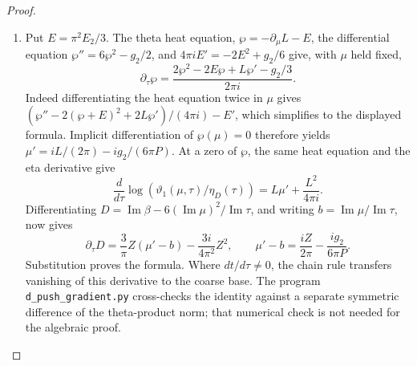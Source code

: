 \begin{proof}
\begin{enumerate}[label=\arabic*.,leftmargin=*]
\item Put \(E=\pi^2E_2/3\). The theta heat equation,
\(\wp=-\partial_\mu L-E\), the differential equation
\(\wp''=6\wp^2-g_2/2\), and
\(4\pi i E'=-2E^2+g_2/6\) give, with \(\mu\) held fixed,
\[
 \partial_\tau\wp=
 \frac{2\wp^2-2E\wp+L\wp'-g_2/3}{2\pi i}.
\]
Indeed differentiating the heat equation twice in \(\mu\) gives
\((\wp''-2(\wp+E)^2+2L\wp')/(4\pi i)-E'\), which simplifies to
the displayed formula. Implicit differentiation of \(\wp(\mu)=0\)
therefore yields
\(\mu'=iL/(2\pi)-ig_2/(6\pi P)\).
At a zero of \(\wp\), the same heat equation and the eta derivative
give
\[
 \frac{d}{d\tau}\log(\vartheta_1(\mu,\tau)/\eta_D(\tau))
       =L\mu'+\frac{L^2}{4\pi i}.
\]
Differentiating \(D=\operatorname{Im}\beta-
6(\operatorname{Im}\mu)^2/\operatorname{Im}\tau\), and writing
\(b=\operatorname{Im}\mu/\operatorname{Im}\tau\), now gives
\[
 \partial_\tau D=\frac3\pi Z(\mu'-b)
                         -\frac{3i}{4\pi^2}Z^2,
 \qquad \mu'-b=\frac{iZ}{2\pi}-\frac{ig_2}{6\pi P}.
\]
Substitution proves the formula. Where \(dt/d\tau\ne0\), the chain
rule transfers vanishing of this derivative to the coarse base.
The program \texttt{d\_push\_gradient.py} cross-checks the identity
against a separate symmetric difference of the theta-product norm;
that numerical check is not needed for the algebraic proof.
\end{enumerate}
\end{proof}

